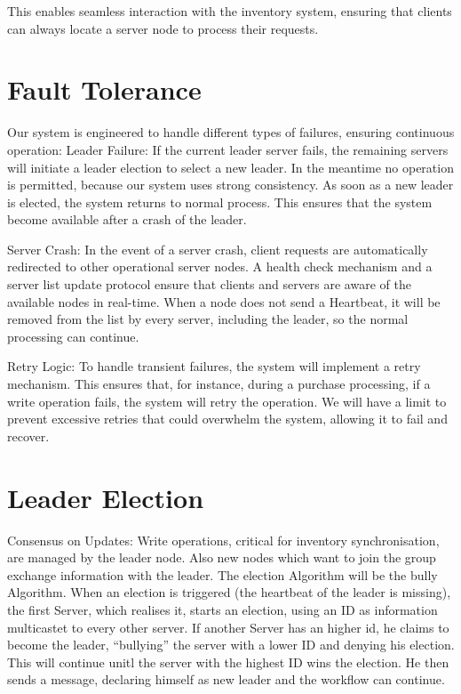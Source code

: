 This enables seamless interaction with the inventory system, ensuring that clients can always locate a server node to process their requests.

\section{Fault Tolerance} \label{sec:FaultTolerance}
Our system is engineered to handle different types of failures, ensuring continuous operation:
Leader Failure: If the current leader server fails, the remaining servers will initiate a leader election to select a new leader. In the meantime no operation is permitted, because our system uses strong consistency. As soon as a new leader is elected, the system returns to normal process.
This ensures that the system become available after a crash of the leader.

Server Crash: In the event of a server crash, client requests are automatically redirected to other operational server nodes. A health check mechanism and a server list update protocol ensure that clients and servers are aware of the available nodes in real-time. When a node does not send a Heartbeat,
it will be removed from the list by every server, including the leader, so the normal processing can continue.

Retry Logic: To handle transient failures, the system will implement a retry mechanism. This ensures that, for instance, during a purchase processing, if a write operation fails, the system will retry the operation. We will have a limit to  prevent excessive retries that could overwhelm the system, allowing it to fail and recover.

\section{Leader Election} \label{sec:Election}
Consensus on Updates: Write operations, critical for inventory synchronisation, are managed by the leader node. Also new nodes which want to join the group exchange information with the leader. The election Algorithm will be the bully Algorithm.
When an election is triggered (the heartbeat of the leader is missing), the first Server, which realises it, starts an election, using an ID as information multicastet to every other server. If another Server has an higher id, he claims to become the leader,
\enquote{bullying} the server with a lower ID and denying his election. This will continue unitl the server with the highest ID wins the election. He then sends a message, declaring himself as new leader and the workflow can continue.


